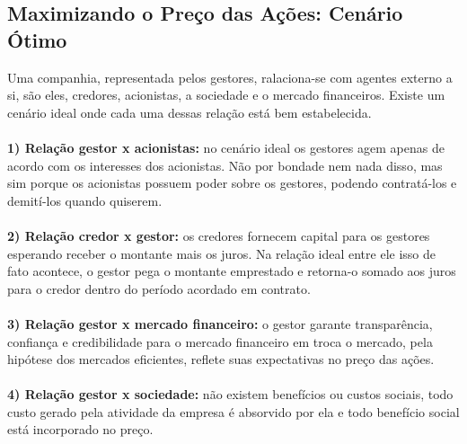 \subsection*{Maximizando o Preço das Ações: Cenário Ótimo}
Uma companhia, representada pelos gestores, ralaciona-se com agentes externo a si, são eles, credores, acionistas, a sociedade e o mercado financeiros. Existe um cenário ideal onde cada uma dessas relação está bem estabelecida.
\\~\\
\textbf{1) Relação gestor x acionistas:} no cenário ideal os gestores agem apenas de acordo com os interesses dos acionistas. Não por bondade nem nada disso, mas sim porque os acionistas possuem poder sobre os gestores, podendo contratá-los e demití-los quando quiserem.
\\~\\
\textbf{2) Relação credor x gestor:} os credores fornecem capital para os gestores esperando receber o montante mais os juros. Na relação ideal entre ele isso de fato acontece, o gestor pega o montante emprestado e retorna-o somado aos juros para o credor dentro do período acordado em contrato.
\\~\\
\textbf{3) Relação gestor x mercado financeiro:} o gestor garante transparência, confiança e credibilidade para o mercado financeiro em troca o mercado, pela hipótese dos mercados eficientes, reflete suas expectativas no preço das ações.
\\~\\
\textbf{4) Relação gestor x sociedade:} não existem benefícios ou custos sociais, todo custo gerado pela atividade da empresa é absorvido por ela e todo benefício social está incorporado no preço.
